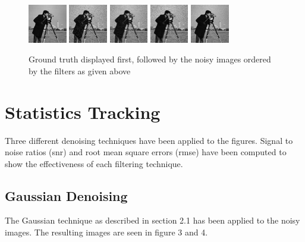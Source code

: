 \documentclass{article}
\begin{document}
 \begin{figure}[H]
      \centering
      \includegraphics[width =0.15\textwidth]{../images/camera_truth}
      \includegraphics[width =0.15\textwidth]{../images/camera_noisy1}
      \includegraphics[width =0.15\textwidth]{../images/camera_noisy2}
      \includegraphics[width =0.15\textwidth]{../images/camera_noisy3}
      \includegraphics[width =0.15\textwidth]{../images/camera_noisy4}
      \caption{Ground truth displayed first, followed by the noisy
        images ordered by the filters as given above}
    \end{figure}   

  \section{Statistics Tracking}
  Three different denoising techniques have been applied to the
  figures. Signal to noise ratios (snr) and root mean
  square errors (rmse) have been computed to show the effectiveness of each
  filtering technique.
  \subsection{Gaussian Denoising}
  The Gaussian technique as described in section 2.1 has been applied
  to the noisy images. The resulting images are seen in figure 3 and 4.
\end{document}

